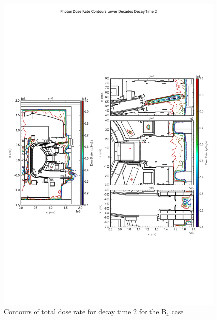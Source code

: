 \documentclass[12pt]{article}
\begin{document}
\begin{figure}[ht!]
\centering
\includegraphics[trim={0cm 8cm, 0cm 8cm},clip,scale=0.75]{../plots/final_model_with_b4c/Photon_Dose_Rate_Contours_Lower_Decades_Decay_Time_2.png}
\caption{Contours of total dose rate for decay time 2 for the B$_4$ case}
\label{fig:photons_dc2_b4c_contours_l}
\end{figure}
\newpage
\clearpage
\end{document}

